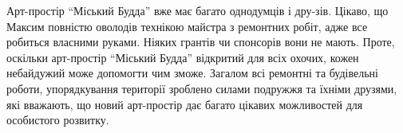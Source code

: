 
Арт-простір \enquote{Міський Будда} вже має багато однодумців і дру\hyp{}зів. Цікаво, що
Максим повністю оволодів технікою майстра з ремонтних робіт, адже все робиться
власними руками. Ніяких грантів чи спонсорів вони не мають. Проте, оскільки
арт-простір \enquote{Міський Будда} відкритий для всіх охочих, кожен небайдужий може
допомогти чим зможе. Загалом всі ремонтні та будівельні роботи, упорядкування
території зроблено силами подружжя та їхніми друзями, які вважають, що новий
арт-простір дає багато цікавих можливостей для особистого розвитку.

